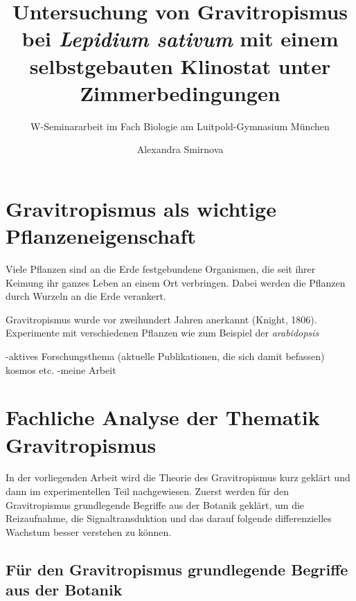 \documentclass[
a4paper, 
11pt, 
ngerman,
listof=totoc,
bibliography=totocnumbered,
abstracton
]{scrreprt}
\title{Untersuchung von Gravitropismus bei \emph{Lepidium sativum} mit einem selbstgebauten Klinostat unter Zimmerbedingungen}
\subtitle{W-Seminararbeit im Fach Biologie am Luitpold-Gymnasium München}
\author{Alexandra Smirnova}
\begin{document}
	
\begingroup
\renewcommand*{\chapterpagestyle}{empty}
\pagestyle{empty}
\maketitle
\tableofcontents
\clearpage
\endgroup
	
\renewcommand\abstractname{Abstract}
\begin{abstract}

	
\end{abstract}


\chapter{Gravitropismus als wichtige Pflanzeneigenschaft}

Viele Pflanzen sind an die Erde festgebundene Organismen, die seit ihrer Keimung ihr ganzes Leben an einem Ort verbringen. Dabei werden die Pflanzen durch Wurzeln an die Erde verankert. 

Gravitropismus wurde vor zweihundert Jahren anerkannt (Knight, 1806). Experimente mit verschiedenen Pflanzen wie zum Beispiel der \emph{arabidopsis}

-aktives Forschungsthema (aktuelle Publikationen, die sich damit befassen) kosmos etc.
-meine Arbeit







\chapter{Fachliche Analyse der Thematik Gravitropismus}

In der vorliegenden Arbeit wird die Theorie des Gravitropismus kurz geklärt und dann im experimentellen Teil nachgewiesen. Zuerst werden für den Gravitropismus grundlegende Begriffe aus der Botanik geklärt, um die Reizaufnahme, die Signaltransduktion und das darauf folgende differenzielles Wachstum besser verstehen zu können.  



\section{Für den Gravitropismus grundlegende Begriffe aus der Botanik}
\end{document}
